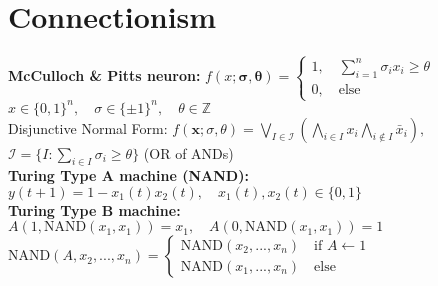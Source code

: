 \section*{Connectionism}
\textbf{McCulloch \& Pitts neuron:} $f(x;\mathbf{\sigma,\theta})=\begin{cases} 
       1, \quad \sum_{i=1}^n\sigma_i x_i\geq\theta\\
       0, \quad \text{else}
       \end{cases}$ \\
$x\in\{0,1\}^n, \quad \sigma\in\{\pm 1\}^n, \quad \theta\in\mathbb{Z}$\\
Disjunctive Normal Form: $f(\mathbf{x};\sigma,\theta)=\bigvee_{I\in\mathcal{I}}(\bigwedge_{i\in I}x_i\bigwedge_{i\notin I}\bar x_i),$\\
$\mathcal{I}=\{I: \sum_{i\in I}\sigma_i\geq \theta\}$ (OR of ANDs)\\
\textbf{Turing Type A machine (NAND):}\\ $y(t+1)=1-x_1(t)x_2(t), \quad x_1(t),x_2(t)\in\{0,1\}$\\
\textbf{Turing Type B machine:}\\
$A(1,\text{NAND}(x_1,x_1))=x_1, \quad A(0,\text{NAND}(x_1,x_1))=1$\\
$\text{NAND}(A,x_2,...,x_n)=\begin{cases} \text{NAND}(x_2,...,x_n) \quad \text{if } A\leftarrow 1 \\ \text{NAND}(x_1,...,x_n) \quad \text{else}\end{cases}$


